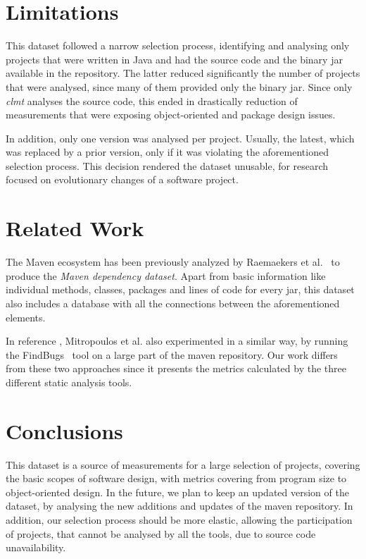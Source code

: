 \documentclass{sig-alternate}
\begin{document}
\section{Limitations}
\label{sec:limit}

This dataset followed a narrow selection process, identifying and analysing only projects that were written in Java and had the source code and the binary {\sc jar} available in the repository. The latter reduced significantly the number of projects that were analysed, since many of them provided only the binary {\sc jar}. Since only \textit{clmt} analyses the source code, this ended in drastically reduction of measurements that were exposing object-oriented and package design issues.

In addition, only one version was analysed per project. Usually, the latest, which was replaced by a prior version, only if it was violating the aforementioned selection process. This decision rendered the dataset unusable, for research focused on evolutionary changes of a software project.

\section{Related Work}
\label{sec:rel}

The Maven ecosystem has been previously analyzed by Raemaekers et al.~\cite{RDV13} to produce the {\it Maven dependency dataset}. Apart from basic information like individual methods, classes, packages and lines of code for every {\sc jar}, this dataset also includes a database with all the connections between the aforementioned elements.

In reference \cite{MKLGS14}, Mitropoulos et al. also experimented in a similar way, by running the FindBugs~\cite{HP04} tool on a large part of the maven repository. Our work differs from these two approaches since it presents the metrics calculated by the three different static analysis tools.

\section{Conclusions}
\label{sec:conc}

This dataset is a source of measurements for a large selection of projects, covering the basic scopes of software design, with metrics covering from program size to object-oriented design. In the future, we plan to keep an updated version of the dataset, by analysing the new additions and updates of the maven repository. In addition, our selection process should be more elastic, allowing the participation of projects, that cannot be analysed by all the tools, due to source code unavailability.
\end{document}
